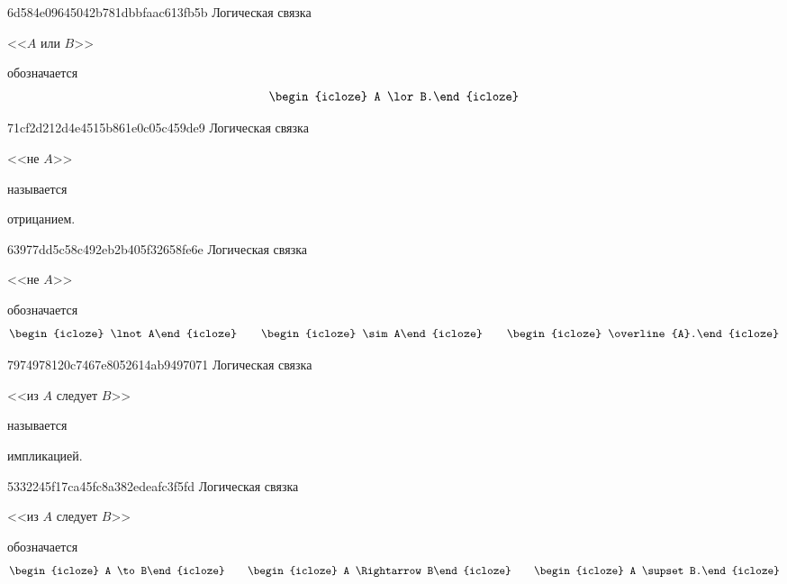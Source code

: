 \begin{note}{6d584e09645042b781dbbfaac613fb5b}
    Логическая связка \begin{icloze}{2}<<\({ A }\) или \({ B }\)>>\end{icloze} обозначается
    \[
        \begin{icloze}{1}A \lor B.\end{icloze}
    \]
\end{note}

\begin{note}{71cf2d212d4e4515b861e0c05c459de9}
    Логическая связка \begin{icloze}{2}<<не \({ A }\)>>\end{icloze} называется \begin{icloze}{1}отрицанием.\end{icloze}
\end{note}

\begin{note}{63977dd5c58c492eb2b405f32658fe6e}
    Логическая связка \begin{icloze}{2}<<не \({ A }\)>>\end{icloze} обозначается
    \[
        \begin{icloze}{1}\lnot A\end{icloze} \qquad \begin{icloze}{1}\sim A\end{icloze} \qquad \begin{icloze}{1}\overline{A}.\end{icloze}
    \]
\end{note}

\begin{note}{7974978120c7467e8052614ab9497071}
    Логическая связка \begin{icloze}{2}<<из \({ A }\) следует \({ B }\)>>\end{icloze} называется \begin{icloze}{1}импликацией.\end{icloze}
\end{note}

\begin{note}{5332245f17ca45fc8a382edeafc3f5fd}
    Логическая связка \begin{icloze}{2}<<из \({ A }\) следует \({ B }\)>>\end{icloze} обозначается
    \[
        \begin{icloze}{1}A \to B\end{icloze} \qquad \begin{icloze}{1}A \Rightarrow B\end{icloze} \qquad \begin{icloze}{1}A \supset B.\end{icloze}
    \]
\end{note}

